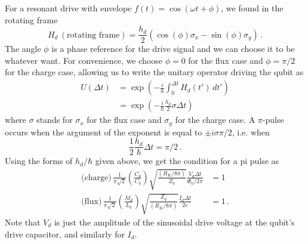 For a resonant drive with envelope $f(t) = \cos(\omega t + \phi)$, we found in the rotating frame
\begin{equation*}
  H_d \, (\text{rotating frame})
  = \frac{h_d}{2} \left( \cos(\phi) \sigma_x - \sin(\phi) \sigma_y \right) \, .
\end{equation*}
The angle $\phi$ is a phase reference for the drive signal and we can choose it to be whatever want.
For convenience, we choose $\phi=0$ for the flux case and $\phi=\pi/2$ for the charge case, allowing us to write the unitary operator driving the qubit as
\begin{align*}
  U(\Delta t)
  &= \exp \left( -\frac{i}{\hbar} \int_0^{\Delta t} H_d(t') \, dt' \right) \\
  &= \exp \left( -\frac{i}{\hbar} \frac{h_d}{2} \sigma \Delta t \right)
\end{align*}
where $\sigma$ stands for $\sigma_x$ for the flux case and $\sigma_y$ for the charge case.
A $\pi$-pulse occurs when the argument of the exponent is equal to $\pm i \sigma \pi / 2$, i.e. when
\begin{equation*}
  \frac{1}{2} \frac{h_d}{\hbar} \Delta t = \pi / 2 \, .
\end{equation*}
Using the forms of $h_d/\hbar$ given above, we get the condition for a pi pulse as
\begin{align*}
  \text{(charge)} \, \frac{1}{\pi\sqrt{2}} \left( \frac{C_d}{C_q} \right) \sqrt{\frac{(R_K/8\pi)}{Z_q}} \frac{V_d \Delta t}{\Phi_0/2\pi} &= 1 \\
  \text{(flux)} \, \frac{1}{\pi\sqrt{2}} \left( \frac{M_d}{L_q} \right) \sqrt{\frac{Z_q}{(R_K/8\pi)}} \frac{I_d \Delta t}{2e} &= 1 \, .
\end{align*}
Note that $V_d$ is just the amplitude of the sinusoidal drive voltage at the qubit's drive capacitor, and similarly for $I_d$.


